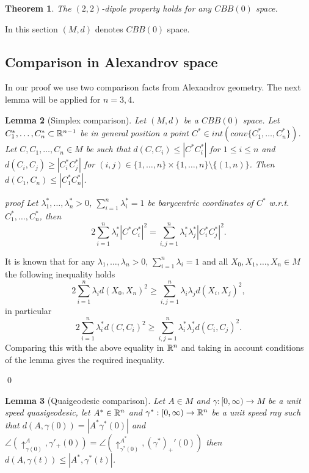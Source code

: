 \documentclass[a4paper,12pt]{article}
\newtheorem{theorem}{Theorem}
\newtheorem{lemma}[theorem]{Lemma}
\theoremstyle{definition}
\theoremstyle{definition}
\theoremstyle{definition}
\begin{document}
\begin{theorem}
The $(2,2)$-dipole property holds for
any $CBB(0)$ space.


\end{theorem}

In this section $(M,d)$ denotes $CBB(0)$ space.

\subsection{Comparison in Alexandrov space }

In our proof we use two comparison facts from Alexandrov geometry.
The next lemma will be applied for $n=3,4$.

\begin{lemma}[Simplex comparison]\label{comparison}
Let $(M, d)$ be a $CBB(0)$ space.
Let
$C_1^*,\dots , C_n^*\subset {\mathbb R}^{n-1}$ be in general position
a point
$C^*\in int (conv \{C_1^*,\dots , C_n^*\})$.  Let
$C, C_1,\dots, C_n\in M$  be such that
$d(C, C_i)\le |C^*C_i^*|$ for $1\le i\le n$ and $d(C_i, C_j)\ge|C_i^*C_j^*|$
for $(i,j)\in \{1,\dots, n\}\times\{1,\dots,n\}\setminus \{(1,n)\}$.
Then
$d(C_1,C_n)\le |C_1^*C_n^*|$.

\end{lemma}

\it{proof}
Let
$\lambda_1^*,\dots,\lambda_n^*>0$, $\sum_{i=1}^n\lambda_i^*=1$
be  barycentric coordinates
of $C^*$ w.r.t. $C_1^*,\dots, C_n^*$, 
then
$$2\sum_{i=1}^n \lambda_i^* |C^*C_i^*|^2=\sum_{i,j=1}^n \lambda_i^*\lambda_j^*|C_i^* C_j^*|^2. $$

It is known that for any
$\lambda_1,\dots,\lambda_n>0$, $\sum_{i=1}^n\lambda_i=1$ and
all $X_0, X_1,\dots, X_n\in M$ the following inequality holds
$$2\sum_{i=1}^n \lambda_i d(X_0,X_n)^2\ge \sum_{i,j=1}^n \lambda_i\lambda_jd(X_i, X_j)^2, $$
in particular
$$2\sum_{i=1}^n \lambda_i^* d(C,  C_i)^2
\ge \sum_{i,j=1}^n \lambda_i^*\lambda_j^*d(C_i, C_j)^2. $$
Comparing this with the above equality in ${\mathbb R}^n$ and
taking in account conditions of the lemma gives the required inequality.

          
    \qed\par\medskip
         
\begin{lemma}[Quaigeodesic comparison]\label{QG}
Let $A\in M$ and
$\gamma:[0,\infty)\to M$
be a unit speed quasigeodesic, let
$A^*\in{\mathbb R}^n$ and
$\gamma^*:[0,\infty)\to {\mathbb R}^n$
be a unit speed ray such that
$d(A,\gamma(0))=|A^*\gamma^*(0)|$
and $\angle(\uparrow_{\gamma(0)}^ A, \gamma'_+(0))=
\angle(\uparrow_{\gamma^*(0)}^{A^*}, (\gamma^*)_+'(0)) $
then $d(A,\gamma(t))\le |A^*,\gamma^*(t)|$.

\end{lemma}
\end{document}
